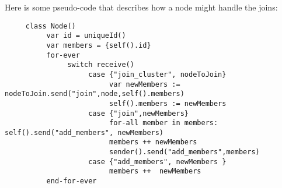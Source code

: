 Here is some pseudo-code that describes how a node might handle the joins:


\begin{verbatim}
     class Node()
          var id = uniqueId()
          var members = {self().id}
          for-ever
               switch receive()
                    case {"join_cluster", nodeToJoin}
                         var newMembers := nodeToJoin.send("join",node,self().members)
                         self().members := newMembers
                    case {"join",newMembers}
                         for-all member in members: self().send("add_members", newMembers)
                         members ++ newMembers
                         sender().send("add_members",members)
                    case {"add_members", newMembers }
                         members ++  newMembers
          end-for-ever
\end{verbatim}




